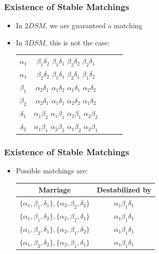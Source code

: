 \documentclass[mathserif,serif]{beamer}
\begin{document}
\begin{frame}
  \frametitle{Existence of Stable Matchings}

  \begin{itemize}
  \item In $2DSM$, we are guaranteed a matching
  \item In $3DSM$, this is not the case:
    \begin{center}
      \begin{tabular}{c | c c c c}
        $\alpha_1$ & $\beta_1\delta_2$ $\beta_1\delta_1$ $\beta_2\delta_2$ $\beta_2\delta_1$ \\
        $\alpha_1$ & $\beta_2\delta_2$ $\beta_1\delta_1$ $\beta_2\delta_1$ $\beta_1\delta_2$ \\ \hline
        $\beta_1$ & $\alpha_2\delta_1$ $\alpha_1\delta_2$ $\alpha_1\delta_1$ $\alpha_2\delta_2$ \\
        $\beta_2$ & $\alpha_2\delta_1$ $\alpha_1\delta_1$ $\alpha_2\delta_2$ $\alpha_1\delta_2$ \\ \hline
        $\delta_1$ & $\alpha_1\beta_2$ $\alpha_1\beta_1$ $\alpha_2\beta_1$ $\alpha_2\beta_2$ \\
        $\delta_2$ & $\alpha_1\beta_1$ $\alpha_2\beta_2$ $\alpha_1\beta_2$ $\alpha_2\beta_1$ \\
      \end{tabular}
    \end{center}
  \end{itemize}
\end{frame}

\begin{frame}
  \frametitle{Existence of Stable Matchings}
  \begin{itemize}
  \item Possible matchings are:
    \begin{center}
      \begin{tabular}{c | c}
        Marriage & Destabilized by \\ \hline
        $\{\alpha_1, \beta_1, \delta_1\}, \{\alpha_2, \beta_2, \delta_2\}$ & $\alpha_1\beta_1\delta_1$ \\
        $\{\alpha_1, \beta_1, \delta_2\}, \{\alpha_2, \beta_2, \delta_1\}$ & $\alpha_1\beta_1\delta_1$ \\
        $\{\alpha_1, \beta_2, \delta_1\}, \{\alpha_2, \beta_1, \delta_2\}$ & $\alpha_1\beta_1\delta_1$ \\
        $\{\alpha_1, \beta_2, \delta_2\}, \{\alpha_2, \beta_1, \delta_1\}$ & $\alpha_1\beta_1\delta_1$ \\
      \end{tabular}
    \end{center}
  \end{itemize}
\end{frame}
\end{document}
